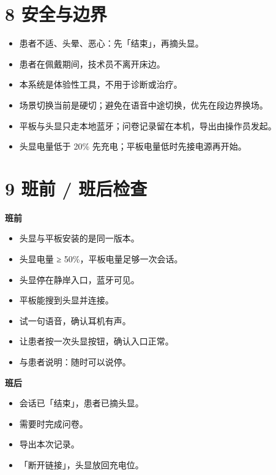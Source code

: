 \documentclass[
  chinese,
  letterpaper,
  DIV=11,
  numbers=noendperiod]{scrartcl}
\providecommand{\tightlist}{%
  \setlength{\itemsep}{0pt}\setlength{\parskip}{0pt}}
\begin{document}
\section{8 安全与边界}\label{ux5b89ux5168ux4e0eux8fb9ux754c}

\begin{itemize}
\tightlist
\item
  患者不适、头晕、恶心：先「结束」，再摘头显。
\item
  患者在佩戴期间，技术员不离开床边。
\item
  本系统是体验性工具，不用于诊断或治疗。
\item
  场景切换当前是硬切；避免在语音中途切换，优先在段边界换场。
\item
  平板与头显只走本地蓝牙；问卷记录留在本机，导出由操作员发起。
\item
  头显电量低于 20\% 先充电；平板电量低时先接电源再开始。
\end{itemize}

\section{9 班前 / 班后检查}\label{ux73edux524d-ux73edux540eux68c0ux67e5}

\textbf{班前}

\begin{itemize}
\tightlist
\item[$\square$]
  头显与平板安装的是同一版本。
\item[$\square$]
  头显电量 ≥ 50\%，平板电量足够一次会话。
\item[$\square$]
  头显停在静岸入口，蓝牙可见。
\item[$\square$]
  平板能搜到头显并连接。
\item[$\square$]
  试一句语音，确认耳机有声。
\item[$\square$]
  让患者按一次头显按钮，确认入口正常。
\item[$\square$]
  与患者说明：随时可以说停。
\end{itemize}

\textbf{班后}

\begin{itemize}
\tightlist
\item[$\square$]
  会话已「结束」，患者已摘头显。
\item[$\square$]
  需要时完成问卷。
\item[$\square$]
  导出本次记录。
\item[$\square$]
  「断开链接」，头显放回充电位。
\end{itemize}
\end{document}
